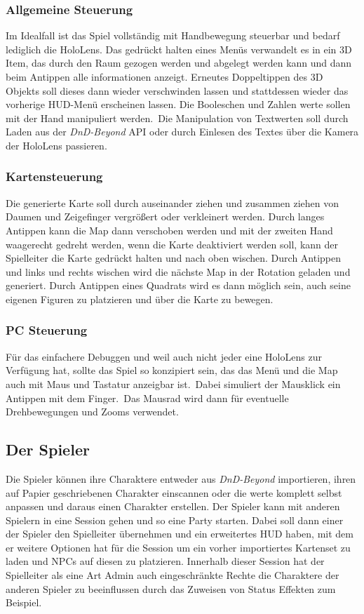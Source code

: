 \subsubsection{Allgemeine Steuerung}
Im Idealfall ist das Spiel vollständig mit Handbewegung steuerbar und bedarf lediglich die HoloLens.
Das gedrückt halten eines Menüs verwandelt es in ein 3D Item, das durch den Raum gezogen werden und abgelegt werden
kann und dann beim Antippen alle informationen anzeigt.
Erneutes Doppeltippen des 3D Objekts soll dieses dann wieder verschwinden lassen und stattdessen wieder das vorherige
HUD-Menü erscheinen lassen.\newline
Die Booleschen und Zahlen werte sollen mit der Hand manipuliert werden.\ Die Manipulation von Textwerten soll durch
Laden aus der \textit{DnD-Beyond} API oder durch Einlesen des Textes über die Kamera der HoloLens passieren.\newblock

\subsubsection{Kartensteuerung}
Die generierte Karte soll durch auseinander ziehen und zusammen ziehen von Daumen und Zeigefinger vergrößert oder
verkleinert werden.
Durch langes Antippen kann die Map dann verschoben werden und mit der zweiten Hand waagerecht gedreht werden,
wenn die Karte deaktiviert werden soll, kann der Spielleiter die Karte gedrückt halten und nach oben wischen.
Durch Antippen und links und rechts wischen wird die nächste Map in der Rotation geladen und generiert.
Durch Antippen eines Quadrats wird es dann möglich sein, auch seine eigenen Figuren zu platzieren und über die Karte zu
bewegen.\newblock

\subsubsection{PC Steuerung}
Für das einfachere Debuggen und weil auch nicht jeder eine HoloLens zur Verfügung hat, sollte das Spiel so konzipiert
sein, das das Menü und die Map auch mit Maus und Tastatur anzeigbar ist.\ Dabei simuliert der Mausklick ein Antippen
mit dem Finger.\ Das Mausrad wird dann für eventuelle Drehbewegungen und Zooms verwendet.\newblock

\subsection{Der Spieler}\label{subsec:gameplay_player}
Die Spieler können ihre Charaktere entweder aus \textit{DnD-Beyond} importieren, ihren auf Papier geschriebenen Charakter
einscannen oder die werte komplett selbst anpassen und daraus einen Charakter erstellen.
Der Spieler kann mit anderen Spielern in eine Session gehen und so eine Party starten.
Dabei soll dann einer der Spieler den Spielleiter übernehmen und ein erweitertes HUD haben, mit dem er weitere Optionen
hat für die Session um ein vorher importiertes Kartenset zu laden und NPCs auf diesen zu platzieren.
Innerhalb dieser Session hat der Spielleiter als eine Art Admin auch eingeschränkte Rechte die Charaktere der anderen
Spieler zu beeinflussen durch das Zuweisen von Status Effekten zum Beispiel.\newblock

